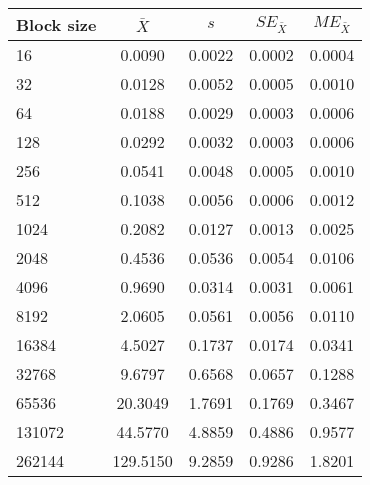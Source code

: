 \begin{tabular}{lcccc}\toprule
{\small Block size} & $\bar{X}$ & $s$ & $SE_{\bar{X}}$ & $ME_{\bar{X}}$ \\\midrule
16 & 0.0090 & 0.0022 & 0.0002 & 0.0004\\
32 & 0.0128 & 0.0052 & 0.0005 & 0.0010\\
64 & 0.0188 & 0.0029 & 0.0003 & 0.0006\\
128 & 0.0292 & 0.0032 & 0.0003 & 0.0006\\
256 & 0.0541 & 0.0048 & 0.0005 & 0.0010\\
512 & 0.1038 & 0.0056 & 0.0006 & 0.0012\\
1024 & 0.2082 & 0.0127 & 0.0013 & 0.0025\\
2048 & 0.4536 & 0.0536 & 0.0054 & 0.0106\\
4096 & 0.9690 & 0.0314 & 0.0031 & 0.0061\\
8192 & 2.0605 & 0.0561 & 0.0056 & 0.0110\\
16384 & 4.5027 & 0.1737 & 0.0174 & 0.0341\\
32768 & 9.6797 & 0.6568 & 0.0657 & 0.1288\\
65536 & 20.3049 & 1.7691 & 0.1769 & 0.3467\\
131072 & 44.5770 & 4.8859 & 0.4886 & 0.9577\\
262144 & 129.5150 & 9.2859 & 0.9286 & 1.8201\\
\bottomrule
\end{tabular}
